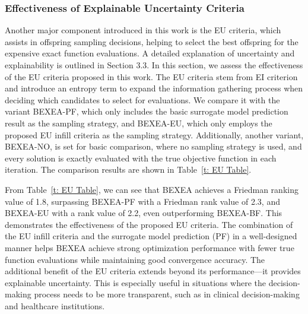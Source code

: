 \documentclass[review]{elsarticle}
\begin{document}
\subsubsection{Effectiveness of Explainable Uncertainty Criteria}
Another major component introduced in this work is the EU criteria, which assists in offspring sampling decisions, helping to select the best offspring for the expensive exact function evaluations. A detailed explanation of uncertainty and explainability is outlined in Section 3.3. In this section, we assess the effectiveness of the EU criteria proposed in this work. The EU criteria stem from EI criterion and introduce an entropy term to expand the information gathering process when deciding which candidates to select for evaluations. We compare it with the variant BEXEA-PF, which only includes the basic surrogate model prediction result as the sampling strategy, and BEXEA-EU, which only employs the proposed EU infill criteria as the sampling strategy. Additionally, another variant, BEXEA-NO, is set for basic comparison, where no sampling strategy is used, and every solution is exactly evaluated with the true objective function in each iteration. The comparison results are shown in Table~\ref{t: EU Table}.

From Table~\ref{t: EU Table}, we can see that BEXEA achieves a Friedman ranking value of 1.8, surpassing BEXEA-PF with a Friedman rank value of 2.3, and BEXEA-EU with a rank value of 2.2, even outperforming BEXEA-BF. This demonstrates the effectiveness of the proposed EU criteria. The combination of the EU infill criteria and the surrogate model prediction (PF) in a well-designed manner helps BEXEA achieve strong optimization performance with fewer true function evaluations while maintaining good convergence accuracy. The additional benefit of the EU criteria extends beyond its performance—it provides explainable uncertainty. This is especially useful in situations where the decision-making process needs to be more transparent, such as in clinical decision-making and healthcare institutions.
\end{document}

